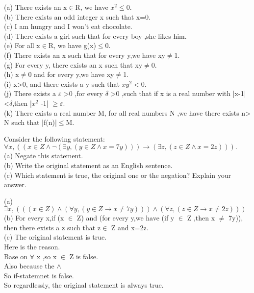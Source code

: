 \documentclass[11pt, a4paper, UTF8]{ctexart}
\begin{document}
\begin{solution}
 (a) There exists an x$\in$R, we have $x^2 \le 0$.\\
 (b) There exists an odd integer x such that x=0.\\
 (c) I am hungry and I won't eat chocolate.\\
 (d) There exists a girl such that for every boy ,she likes him.\\
 (e) For all x$\in$R, we have g(x)$\le 0.$\\
 (f) There exists an x such that for every y,we have xy$\not=$1.\\
 (g) For every y, there exists an x such that xy$\not=$0.\\ 
 (h)  x$\not=$0 and for every y,we have xy$\not=$1.\\
 (i)  x>0, and there exists a y such that $xy^2 <$0.\\
 (j) There exists a $\varepsilon$ >0 ,for every $\delta$ >0 ,such that if x is a real number with |x-1|<$\delta$,then |$x^2$ -1| $\geq \varepsilon$.\\
 (k) There exists a real number M, for all real numbers N ,we have there exists n> N such that |f(n)|$\le$M.\\
\end{solution}


\begin{problem}[UD:4.7]
Consider the following statement:\\
$\forall x,((x  \in  Z \wedge \neg (\exists y,(y \in Z \wedge x = 7y))) \rightarrow (\exists z,(z \in Z \wedge x = 2z))).$\\
(a) Negate this statement.\\
(b) Write the original statement as an English sentence.\\
(c) Which statement is true, the original one or the negation? Explain your answer.
\end{problem}

\begin{solution}
(a) $\exists x,(((x\in Z)\wedge (\forall y,(y\in Z \rightarrow x \not= 7y))) \wedge (\forall z,(z\in Z \rightarrow x\not= 2z)))$\\
(b) For every x,if (x $\in $ Z) and (for every y,we have (if y $\in$ Z ,then x $\not=$ 7y)), then there exists a z such that z$\in$ Z and x=2z.\\ 
(c) The original statement is true.\\
    Here is the reason.\\
    Base on $\forall$ x ,so x $\in$ Z is false.\\
    Also because the $\wedge$\\
    So if-statemnet is false.\\
    So regardlessly, the original statement is always true.
\end{solution}
\end{document}
